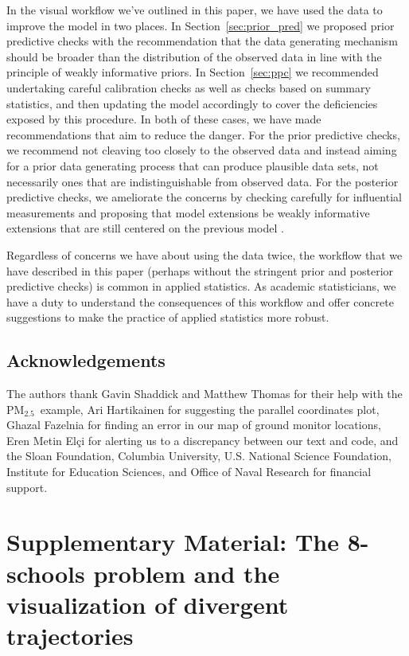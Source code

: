 \documentclass{statsoc}
\newcommand{\PM}{PM$_{2.5}$}
\begin{document}
In the visual workflow we've outlined in this paper, we have used the data to
improve the model in two places. In Section~\ref{sec:prior_pred} we proposed
prior predictive checks with the recommendation that the data generating
mechanism should be broader than the distribution of the observed data in line
with the principle of weakly informative priors. In Section~\ref{sec:ppc} we
recommended undertaking careful calibration checks as well as checks based on
summary statistics, and then updating the model accordingly to cover the
deficiencies exposed by this procedure. In both of these cases, we have made
recommendations that aim to reduce the danger. For the prior predictive checks,
we recommend not cleaving too closely to the observed data and instead aiming
for a prior data generating process that can produce plausible data sets, not
necessarily ones that are indistinguishable from observed data. For the
posterior predictive checks, we ameliorate the concerns by checking carefully
for influential measurements and proposing that model extensions be weakly
informative extensions that are still centered on the previous model
\citep{simpson2017penalising}.

Regardless of concerns we have about using the data twice, the workflow that we
have described in this paper (perhaps without the stringent prior and posterior
predictive checks) is common in applied statistics. As academic statisticians,
we have a duty to understand the consequences of this workflow and offer
concrete suggestions to make the practice of applied statistics more robust.

\subsection*{Acknowledgements}

The authors thank Gavin Shaddick and Matthew Thomas for their help with the \PM\
example, Ari Hartikainen for suggesting the parallel coordinates plot,
Ghazal Fazelnia for finding an error in our map of ground monitor locations,
Eren Metin El\c{c}i for alerting us to a discrepancy between our text and code,
and the Sloan Foundation, Columbia University, U.S. National Science Foundation,
Institute for Education Sciences, and Office of Naval Research for financial support.







\clearpage
\section*{Supplementary Material: The 8-schools problem and the visualization of divergent trajectories}
\end{document}
